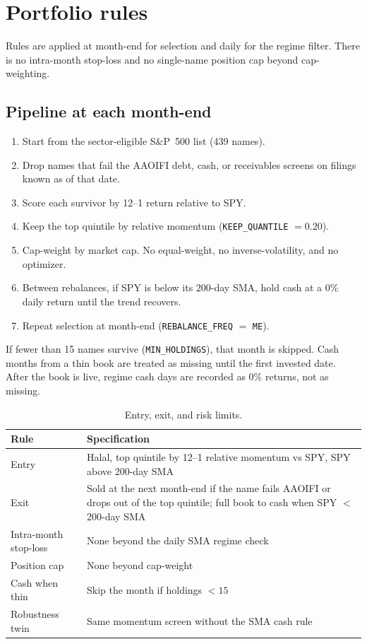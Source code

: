 \documentclass[11pt,letterpaper]{article}
\begin{document}
\section{Portfolio rules}
\label{sec:rules}

Rules are applied at month-end for selection and daily for the regime filter. There is no intra-month stop-loss and no single-name position cap beyond cap-weighting.

\subsection{Pipeline at each month-end}

\begin{enumerate}
  \item Start from the sector-eligible S\&P~500 list (439 names).
  \item Drop names that fail the AAOIFI debt, cash, or receivables screens on filings known as of that date.
  \item Score each survivor by 12--1 return relative to SPY.
  \item Keep the top quintile by relative momentum (\texttt{KEEP\_QUANTILE} $= 0.20$).
  \item Cap-weight by market cap. No equal-weight, no inverse-volatility, and no optimizer.
  \item Between rebalances, if SPY is below its 200-day SMA, hold cash at a 0\% daily return until the trend recovers.
  \item Repeat selection at month-end (\texttt{REBALANCE\_FREQ} $=$ \texttt{ME}).
\end{enumerate}

If fewer than 15 names survive (\texttt{MIN\_HOLDINGS}), that month is skipped. Cash months from a thin book are treated as missing until the first invested date. After the book is live, regime cash days are recorded as 0\% returns, not as missing.

\begin{table}[htbp]
\centering
\caption{Entry, exit, and risk limits.}
\label{tab:rules}
\small
\begin{tabular}{lp{}}
\toprule
Rule & Specification \\
\midrule
Entry & Halal, top quintile by 12--1 relative momentum vs SPY, SPY above 200-day SMA \\
Exit & Sold at the next month-end if the name fails AAOIFI or drops out of the top quintile; full book to cash when SPY $<$ 200-day SMA \\
Intra-month stop-loss & None beyond the daily SMA regime check \\
Position cap & None beyond cap-weight \\
Cash when thin & Skip the month if holdings $< 15$ \\
Robustness twin & Same momentum screen without the SMA cash rule \\
\bottomrule
\end{tabular}
\end{table}
\end{document}
